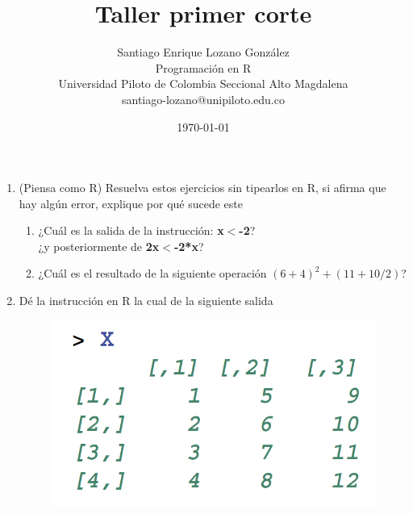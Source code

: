 \documentclass[12pt]{article} %
\title{Taller primer corte}
\author{Santiago Enrique Lozano González \\
	Programación en R \\
	Universidad Piloto de Colombia Seccional Alto Magdalena  \\
	santiago-lozano@unipiloto.edu.co \\
	}
\date{\today}
\begin{document}
\maketitle
\begin{enumerate}
\item (Piensa como R) Resuelva estos ejercicios sin tipearlos en R, si afirma que hay algún error, explique por qué sucede este
\begin{enumerate}
\item ¿Cuál es la salida de la instrucción: \textbf{x$<$-2}? \\
¿y posteriormente de \textbf{2x$<$-2*x}?
\item ¿Cuál es el resultado de la siguiente operación $(6+4)^2+(11+10/2)$?
\end{enumerate}
\item Dé la instrucción en R la cual de la siguiente salida
\begin{center}
\begin{figure}
\includegraphics[scale=0.44]{matriz.png}
\end{figure}
\end{center}
\end{enumerate}
\end{document}
